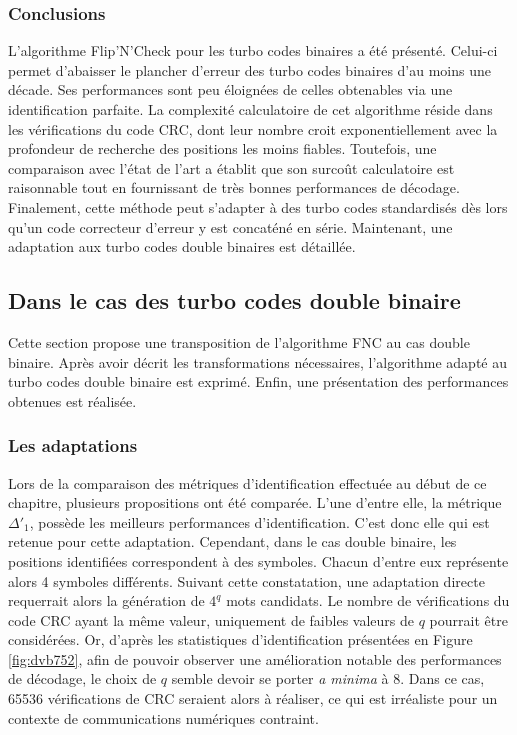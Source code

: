 \subsubsection{Conclusions}
L'algorithme Flip'N'Check pour les turbo codes binaires a été présenté. Celui-ci permet d'abaisser le plancher d'erreur 
des turbo codes binaires d'au moins une décade. Ses performances sont peu éloignées de celles obtenables via une 
identification parfaite. La complexité calculatoire de cet algorithme réside dans les vérifications du code CRC, dont leur 
nombre croit exponentiellement avec la profondeur de recherche des positions les moins fiables. Toutefois, une 
comparaison avec l'état de l'art a établit que son surcoût calculatoire est raisonnable tout en fournissant de très bonnes 
performances de décodage. Finalement, cette méthode peut s'adapter à des turbo codes standardisés dès lors qu'un code 
correcteur d'erreur y est concaténé en série. Maintenant, une adaptation aux turbo codes double binaires est détaillée.


\subsection{Dans le cas des turbo codes double binaire}
Cette section propose une transposition de l'algorithme FNC au cas double binaire. Après avoir décrit les transformations 
nécessaires, l'algorithme adapté au turbo codes double binaire est exprimé. Enfin, une présentation des performances obtenues 
est réalisée.
\subsubsection{Les adaptations}
Lors de la comparaison des métriques d'identification effectuée au début de ce chapitre, plusieurs propositions ont été 
comparée. L'une d'entre elle, la métrique $\Delta'_1$, possède les meilleurs performances d'identification. C'est donc
elle qui est retenue pour cette adaptation. Cependant, dans le cas double binaire, les positions identifiées correspondent 
à des symboles. Chacun d'entre eux représente alors 4 symboles différents. Suivant cette constatation, une adaptation directe 
requerrait alors la génération de $4^q$ mots candidats. Le nombre de vérifications du code CRC ayant la même valeur, 
uniquement de faibles valeurs de $q$ pourrait être considérées. Or, d'après les statistiques d'identification présentées en Figure 
\ref{fig:dvb752}, afin de pouvoir observer une amélioration notable des performances de décodage, le choix de $q$ semble
devoir se porter \textit{a minima} à 8. Dans ce cas, 65536 vérifications de CRC seraient alors à réaliser, ce qui est 
irréaliste pour un contexte de communications numériques contraint.

